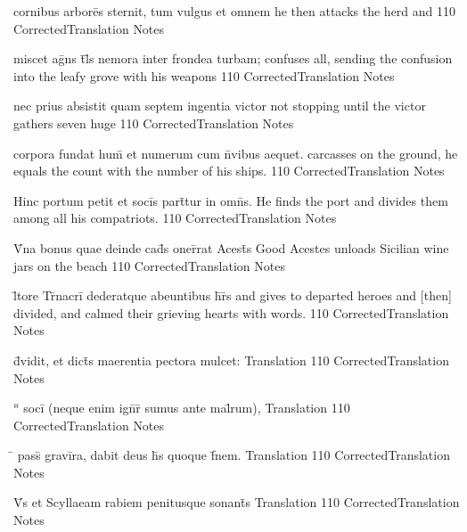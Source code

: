\documentclass[]{book}
\begin{document}
\latline
  {cornibus arbore\={\macron {\i}}s sternit, tum vulgus et omnem}
  { he then attacks the herd and  }
  {110}
  { CorrectedTranslation }
  { Notes }


\latline
  {miscet ag\={}ns t\={}l\={\macron {\i}}s nemora inter frondea turbam;}
  { confuses all, sending the confusion into the leafy grove with his weapons }
  {110}
  { CorrectedTranslation }
  { Notes }


\latline
  {nec prius absistit quam septem ingentia victor }
  { not stopping until the victor gathers seven huge }
  {110}
  { CorrectedTranslation }
  { Notes }



\latline
  {corpora fundat hum\={\macron {\i}} et numerum cum n\={}vibus aequet.}
  { carcasses on the ground, he equals the count with the number of his ships. }
  {110}
  { CorrectedTranslation }
  { Notes }


\latline
  {Hinc portum petit et soci\={}s part\={\macron {\i}}tur in omn\={\macron {\i}}s.}
  { He finds the port and divides them among all his compatriots. }
  {110}
  { CorrectedTranslation }
  { Notes }


\latline
  {V\={\macron {\i}}na bonus quae deinde cad\={\macron {\i}}s oner\={}rat Acest\={}s}
  { Good Acestes unloads Sicilian wine jars on the beach }
  {110}
  { CorrectedTranslation }
  { Notes }



\latline
  {l\={\macron {\i}}tore Tr\={\macron {\i}}nacri\={} dederatque abeuntibus h\={}r\={}s}
  { and gives to departed heroes and [then] divided, and calmed their grieving hearts with words. }
  {110}
  { CorrectedTranslation }
  { Notes }


\latline
  {d\={\macron {\i}}vidit, et dict\={\macron {\i}}s maerentia pectora mulcet:}
  { Translation }
  {110}
  { CorrectedTranslation }
  { Notes }



\latline
  {``\={} soci\={\macron {\i}} (neque enim ign\={}r\={\macron {\i}} sumus ante mal\={}rum),}
  { Translation }
  {110}
  { CorrectedTranslation }
  { Notes }


\latline
  {\={} pass\={\macron {\i}} gravi\={}ra, dabit deus h\={\macron {\i}}s quoque f\={\macron {\i}}nem.}
  { Translation }
  {110}
  { CorrectedTranslation }
  { Notes }


\latline
  {V\={}s et Scyllaeam rabiem penitusque sonant\={\macron {\i}}s}
  { Translation }
  {110}
  { CorrectedTranslation }
  { Notes }
\end{document}
